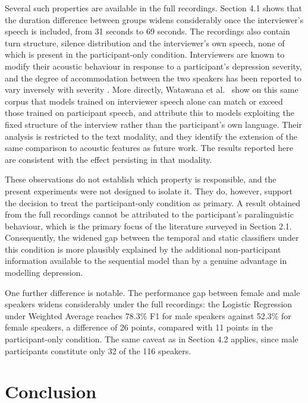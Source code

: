 \documentclass{mproj}
\begin{document}
Several such properties are available in the full recordings. Section 4.1 shows that the duration difference between groups widens considerably once the interviewer's speech is included, from 31 seconds to 69 seconds. The recordings also contain turn structure, silence distribution and the interviewer's own speech, none of which is present in the participant-only condition. Interviewers are known to modify their acoustic behaviour in response to a participant's depression severity, and the degree of accommodation between the two speakers has been reported to vary inversely with severity \cite{scherer2014dyadic}. More directly, Watawana et al.\ \cite{watawana2026} show on this same corpus that models trained on interviewer speech alone can match or exceed those trained on participant speech, and attribute this to models exploiting the fixed structure of the interview rather than the participant's own language. Their analysis is restricted to the text modality, and they identify the extension of the same comparison to acoustic features as future work. The results reported here are consistent with the effect persisting in that modality.

These observations do not establish which property is responsible, and the present experiments were not designed to isolate it. They do, however, support the decision to treat the participant-only condition as primary. A result obtained from the full recordings cannot be attributed to the participant's paralinguistic behaviour, which is the primary focus of the literature surveyed in Section 2.1. Consequently, the widened gap between the temporal and static classifiers under this condition is more plausibly explained by the additional non-participant information available to the sequential model than by a genuine advantage in modelling depression.

One further difference is notable. The performance gap between female and male speakers widens considerably under the full recordings: the Logistic Regression under Weighted Average reaches 78.3\% F1 for male speakers against 52.3\% for female speakers, a difference of 26 points, compared with 11 points in the participant-only condition. The same caveat as in Section 4.2 applies, since male participants constitute only 32 of the 116 speakers.

\chapter{Conclusion}\label{conclusion}
\end{document}
